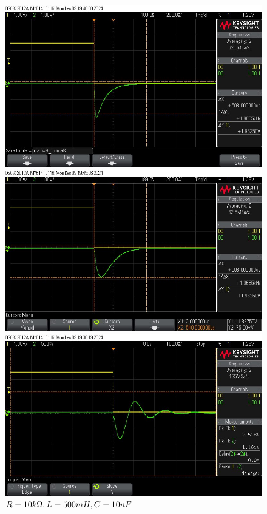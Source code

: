 \begin{figure}[h]
    \centering
    \begin{minipage}[t]{0.33\textwidth} %
        \includegraphics[width=0.9\linewidth]{dajeroma1.jpeg}
        \captionsetup{justification=raggedright, singlelinecheck=false, labelformat=empty}
        \caption{$R=10k\ohm, L=500mH, C=1nF$}
        \label{fig:img1}
    \end{minipage}%
    \hfill %
    \begin{minipage}[t]{0.33\textwidth} %
        \centering
        \includegraphics[width=0.9\linewidth]{dajeroma2.jpeg}
        \captionsetup{justification=raggedright, singlelinecheck=false, labelformat=empty}
        \caption{$R=10k\ohm, L=500mH, C=10nF$}
        \label{fig:img2}
    \end{minipage}%
    \hfill %
    \begin{minipage}[t]{0.33\textwidth} %
        \centering
        \includegraphics[width=0.9\linewidth]{dajeroma3.jpeg}

\end{minipage}
\end{figure}
